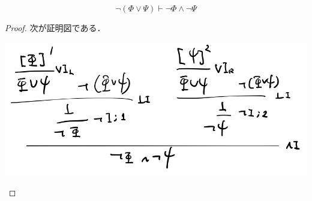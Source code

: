\documentclass[uplatex,dvipdfmx]{jsarticle}
\begin{document}
\begin{lemma}
    \[ \lnot(\Phi\lor\Psi)\vdash\lnot\Phi\land\lnot\Psi \]
\end{lemma}
\begin{proof}
    次が証明図である．
    \begin{center}
        \includegraphics[width=15cm]{figure_demorgan.jpg}
    \end{center}
\end{proof}
\end{document}
